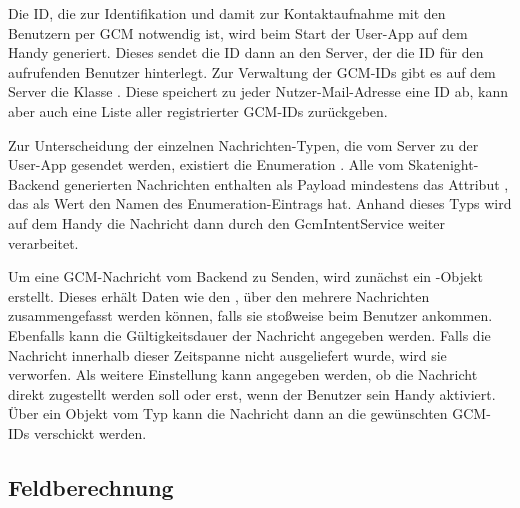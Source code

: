 Die ID, die zur Identifikation und damit zur Kontaktaufnahme mit den Benutzern per GCM notwendig ist, wird beim Start der User-App auf dem Handy generiert. Dieses sendet die ID dann an den Server, der die ID für den aufrufenden Benutzer hinterlegt. Zur Verwaltung der GCM-IDs gibt es auf dem Server die Klasse . Diese speichert zu jeder Nutzer-Mail-Adresse eine ID ab, kann aber auch eine Liste aller registrierter GCM-IDs zurückgeben.

Zur Unterscheidung der einzelnen Nachrichten-Typen, die vom Server zu der User-App gesendet werden, existiert die Enumeration . Alle vom Skatenight-Backend generierten Nachrichten enthalten als Payload mindestens das Attribut , das als Wert den Namen des Enumeration-Eintrags hat. Anhand dieses Typs wird auf dem Handy die Nachricht dann durch den GcmIntentService weiter verarbeitet.

Um eine GCM-Nachricht vom Backend zu Senden, wird zunächst ein -Objekt erstellt. Dieses erhält Daten wie den , über den mehrere Nachrichten zusammengefasst werden können, falls sie stoßweise beim Benutzer ankommen. Ebenfalls kann die Gültigkeitsdauer der Nachricht angegeben werden. Falls die Nachricht innerhalb dieser Zeitspanne nicht ausgeliefert wurde, wird sie verworfen. Als weitere Einstellung kann angegeben werden, ob die Nachricht direkt zugestellt werden soll oder erst, wenn der Benutzer sein Handy aktiviert. Über ein Objekt vom Typ  kann die Nachricht dann an die gewünschten GCM-IDs verschickt werden.

\subsection{Feldberechnung}
\label{subsec:Feldberechnung}
